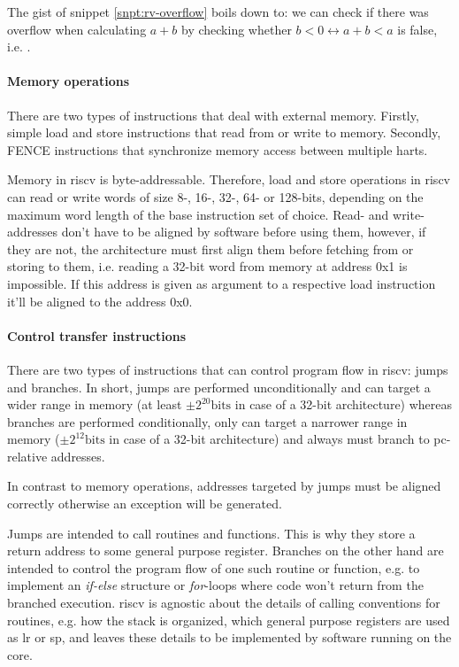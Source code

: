 The gist of snippet \ref{snpt:rv-overflow} boils down to: we can check if there was overflow when calculating $ a + b $ by checking whether $ b < 0 \leftrightarrow a + b < a $ is false, i.e. .

\paragraph{Memory operations}
There are two types of instructions that deal with external memory.
Firstly, simple load and store instructions that read from or write to memory.
Secondly, FENCE instructions that synchronize memory access between multiple \glspl{hart}.

Memory in \gls{riscv} is byte-addressable.
Therefore, load and store operations in \gls{riscv} can read or write words of size 8-, 16-, 32-, 64- or 128-bits, depending on the maximum word length of the base instruction set of choice.
Read- and write-addresses don't have to be aligned by software before using them, however, if they are not, the architecture must first align them before fetching from or storing to them, i.e. reading a 32-bit word from memory at address 0x1 is impossible.
If this address is given as argument to a respective load instruction it'll be aligned to the address 0x0.

\paragraph{Control transfer instructions}
There are two types of instructions that can control program flow in \gls{riscv}: jumps and branches.
In short, jumps are performed unconditionally and can target a wider range in memory (at least $ \pm 2^{20}\text{bits} $ in case of a 32-bit architecture) whereas branches are performed conditionally, only can target a narrower range in memory ($ \pm 2^{12}\text{bits} $ in case of a 32-bit architecture) and always must branch to \gls{pc}-relative addresses.

In contrast to memory operations, addresses targeted by jumps must be aligned correctly otherwise an exception will be generated.

Jumps are intended to call routines and functions.
This is why they store a return address to some general purpose register.
Branches on the other hand are intended to control the program flow of one such routine or function, e.g. to implement an \textit{if-else} structure or \textit{for}-loops where code won't return from the branched execution.
\gls{riscv} is agnostic about the details of calling conventions for routines, e.g. how the stack is organized, which general purpose registers are used as \gls{lr} or \gls{sp}, and leaves these details to be implemented by software running on the core.

